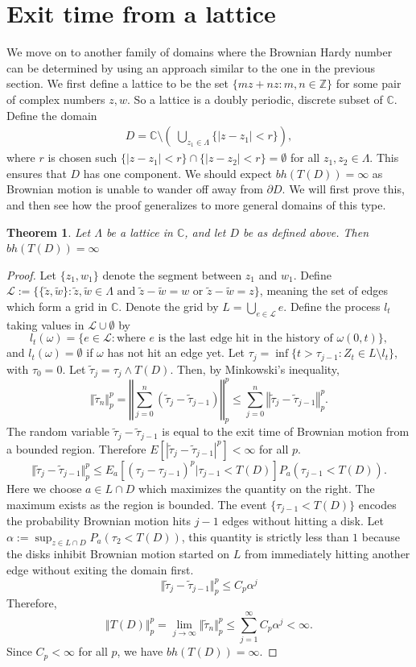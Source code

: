 \documentclass[a4paper, oneside, 12pt]{amsart}
\newcommand{\mc}{\mathcal}
\newcommand{\C}{\mathbb{C}}
\newcommand{\CC}{\mathbb{C}}
\newcommand{\ZZ}{\mathbb{Z}}
\newcommand{\til}{\tilde}
\newtheorem{theorem}{Theorem}[section]
\begin{document}
\section{Exit time from a lattice} \label{periodic}
We move on to another family of domains where the Brownian Hardy number can be
determined by using an approach similar to the one in the previous section. We
first define a lattice to be the set $\{mz+nz:m,n\in \ZZ\}$ for some pair of
complex numbers $z,w$. So a lattice is a doubly periodic, discrete subset of
$\CC$. Define the domain 
\begin{align*} D =
\CC\setminus\left(\;\bigcup_{z_1\in\Lambda} \{|z-z_1|<r\} \right), 
\end{align*}
where $r$ is chosen such $\{|z-z_1|<r\}\cap \{|z-z_2|<r\} = \emptyset$ for
all $z_1, z_2\in\Lambda$. This ensures that $D$ has one component.
We should expect $bh(T(D)) = \infty$ as Brownian motion is unable
to wander off away from $\partial D$. We will first prove this, and then see how the proof generalizes 
to more general domains of this type.
\begin{theorem}\label{lattice}
    Let $\Lambda$ be a lattice in $\C$, and let $D$ be as defined above. Then $bh(T(D)) = \infty$
\end{theorem}
\begin{proof}
    Let $\{z_1, w_1\}$ denote the segment between 
$z_1$ and $w_1$.
Define $\mc{L} := \{\{\tilde z, \tilde w\}: \tilde z, \tilde w \in \Lambda \text{ and } \tilde z - \tilde w = w \text{ or }\tilde z - \tilde w = z\}$,
meaning the set of edges which form a grid in $\CC$.
Denote the grid by $L = \bigcup_{e \in \mc{L}}e$. Define the process $l_t$ taking values in $\mc{L}\cup \emptyset$ by
$$
    l_t(\omega) = \{e\in\mc{L}: \text{where $e$ is the last edge hit in the history of $\omega(0,t)$}\},
$$
and $l_t(\omega) = \emptyset$ if $\omega$ has not hit an edge yet.
Let $\tau_j = \inf\{t>\tau_{j-1}: Z_t \in L \setminus l_t\}$, with $\tau_0 = 0$. Let $\tilde \tau_j = \tau_j \wedge T(D)$. Then, by Minkowski's inequality,
$$
    \Vert \tilde \tau_n \Vert_p^p = \left\Vert \sum_{j=0}^n (\tilde\tau_j - \tilde\tau_{j-1})\right\Vert_p^p\leq
      \sum_{j=0}^n \left\Vert\tilde\tau_j - \tilde\tau_{j-1}\right\Vert_p^p.
$$
The random variable $\til\tau_j - \til \tau_{j-1}$ is equal to the exit time of Brownian motion from a bounded region. Therefore
$E[|\til\tau_j - \til \tau_{j-1}|^p]<\infty$ for all $p$. 
$$
    \Vert\til\tau_j - \til \tau_{j-1}\Vert_p^p \leq E_a[(\tau_j - \tau_{j-1})^p|\tau_{j-1} < T(D)] P_a(\tau_{j-1} < T(D)).
$$
Here we choose $a\in L\cap D$ which maximizes the quantity on the right. The maximum exists as the region is bounded. The event $\{\tau_{j-1} < T(D)\}$ encodes the probability 
Brownian motion hits $j-1$ edges
without hitting a disk. Let $\alpha := \sup_{z\in L\cap D}P_a(\tau_2 < T(D))$, 
this quantity is strictly less than $1$ because the disks inhibit Brownian motion
started on $L$ from immediately hitting another edge without exiting the domain first.
$$
    \Vert\til\tau_j - \til \tau_{j-1}\Vert_p^p \leq C_p \alpha^j
$$
Therefore,
$$
   \Vert T(D)\Vert_p^p = \lim_{j\to\infty} \Vert \til \tau_n \Vert_p^p \leq \sum_{j=1}^\infty C_p \alpha^j  < \infty.
$$
Since $C_p<\infty$ for all $p$, we have $bh(T(D)) = \infty$.
\end{proof}
\end{document}
